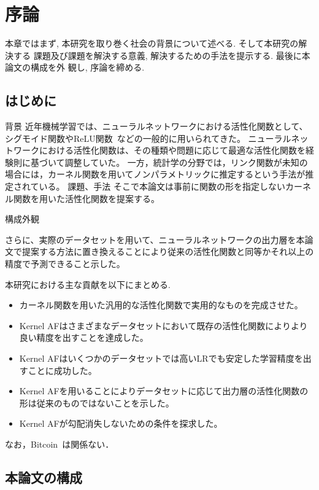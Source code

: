 \chapter{序論}
\label{introduction}

本章ではまず, 本研究を取り巻く社会の背景について述べる. そして本研究の解決する
課題及び課題を解決する意義, 解決するための手法を提示する. 最後に本論文の構成を外
観し, 序論を締める.

\section{はじめに}
\label{introduction:background}

背景
近年機械学習では、ニューラルネットワークにおける活性化関数として、シグモイド関数やReLU関数~\cite{ReLU}などの一般的に用いられてきた。
ニューラルネットワークにおける活性化関数は、その種類や問題に応じて最適な活性化関数を経験則に基づいて調整していた。
一方，統計学の分野では，リンク関数が未知の場合には，カーネル関数を用いてノンパラメトリックに推定するという手法が推定されている。
課題、手法
そこで本論文は事前に関数の形を指定しないカーネル関数を用いた活性化関数を提案する。

構成外観

さらに、実際のデータセットを用いて、ニューラルネットワークの出力層を本論文で提案する方法に置き換えることにより従来の活性化関数と同等かそれ以上の精度で予測できること示した。

本研究における主な貢献を以下にまとめる.

\begin{itemize}
  \item カーネル関数を用いた汎用的な活性化関数で実用的なものを完成させた。
  \item Kernel AFはさまざまなデータセットにおいて既存の活性化関数によりより良い精度を出すことを達成した。
  \item Kernel AFはいくつかのデータセットでは高いLRでも安定した学習精度を出すことに成功した。
  \item Kernel AFを用いることによりデータセットに応じて出力層の活性化関数の形は従来のものではないことを示した。
  \item Kernel AFが勾配消失しないための条件を探求した。
\end{itemize}


なお，Bitcoin~\cite{Bitcoin}は関係ない．

\section{本論文の構成}

